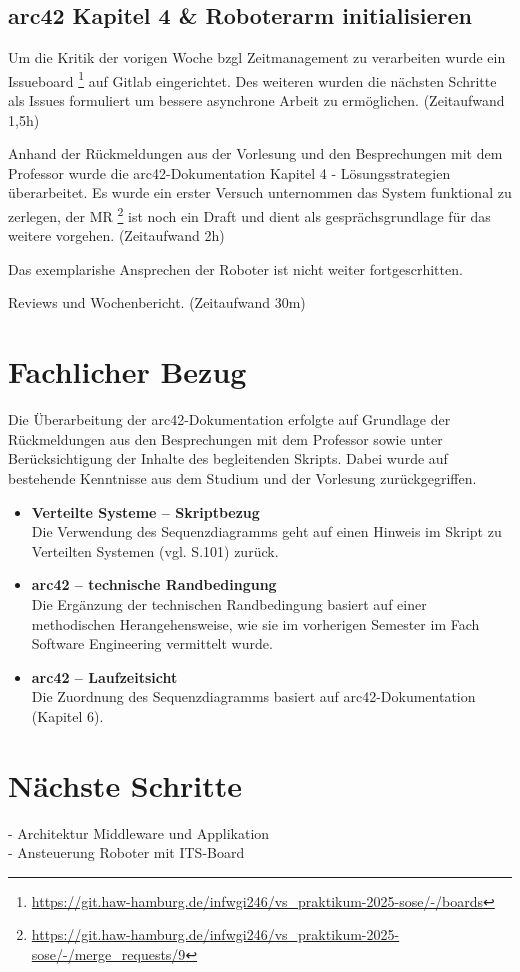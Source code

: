 \documentclass{article}
\begin{document}
\subsection{arc42 Kapitel 4 \& Roboterarm initialisieren} 
Um die Kritik der vorigen Woche bzgl Zeitmanagement zu verarbeiten wurde ein Issueboard
\footnote{\url{https://git.haw-hamburg.de/infwgi246/vs_praktikum-2025-sose/-/boards}}
auf Gitlab eingerichtet. Des weiteren wurden die nächsten Schritte als Issues formuliert 
um bessere asynchrone Arbeit zu ermöglichen. (Zeitaufwand 1,5h)

Anhand der Rückmeldungen aus der Vorlesung und den Besprechungen mit dem Professor wurde die arc42-Dokumentation Kapitel 4 - Lösungsstrategien überarbeitet.
Es wurde ein erster Versuch unternommen das System funktional zu zerlegen, der MR
\footnote{\url{https://git.haw-hamburg.de/infwgi246/vs_praktikum-2025-sose/-/merge_requests/9}}
ist noch ein Draft und dient als gesprächsgrundlage für das weitere vorgehen. (Zeitaufwand 2h)

Das exemplarishe Ansprechen der Roboter ist nicht weiter fortgescrhitten.

Reviews und Wochenbericht. (Zeitaufwand 30m)


\section{Fachlicher Bezug}

Die Überarbeitung der arc42-Dokumentation erfolgte auf Grundlage der Rückmeldungen aus den Besprechungen mit dem Professor sowie unter Berücksichtigung der Inhalte des begleitenden Skripts.  
Dabei wurde auf bestehende Kenntnisse aus dem Studium und der Vorlesung zurückgegriffen.

\begin{itemize}

\item \textbf{Verteilte Systeme – Skriptbezug} \\
Die Verwendung des Sequenzdiagramms geht auf einen Hinweis im Skript zu Verteilten Systemen (vgl. S.101) zurück.
\item \textbf{arc42 – technische Randbedingung} \\
Die Ergänzung der technischen Randbedingung basiert auf einer methodischen Herangehensweise, wie sie im vorherigen Semester im Fach Software Engineering vermittelt wurde.
\item \textbf{arc42 – Laufzeitsicht} \\
Die Zuordnung des Sequenzdiagramms basiert auf arc42-Dokumentation (Kapitel 6).


\end{itemize}

\section{Nächste Schritte}
- Architektur Middleware und Applikation\\
- Ansteuerung Roboter mit ITS-Board
\end{document}
